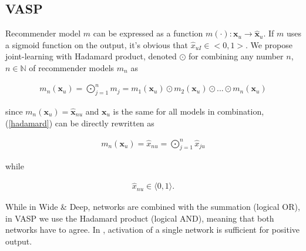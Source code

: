 \documentclass[conference]{IEEEtran}
\begin{document}
    \subsection{VASP}\label{vasp}
    
        
        Recommender model \(m\) can be expressed as a function \(m(\cdot): \mathbf{x}_u \rightarrow \mathbf{\hat{x}}_u\). If \(m\) uses a sigmoid function on the output, it's obvious that \(\hat{x}_{uI} \in <0,1>\). 
        We propose joint-learning with Hadamard product\cite{million2007hadamard}, denoted \(\odot\) for combining any number \(n\), \(n \in \mathbb{N}\) of recommender models \(m_n\) as 
        
            \begin{equation}\label{hadamard}
                \begin{aligned}
                     m_n(\mathbf{x}_{u}) = \bigodot_{j=1}^n{m_j}=m_1(\mathbf{x}_{u}) \odot m_2(\mathbf{x}_{u})\odot...\odot m_n(\mathbf{x}_{u})
                \end{aligned}
            \end{equation}
        
        since \(m_n(\mathbf{x}_{u}) = \mathbf{\hat{x}}_{nu} \) and \(\mathbf{x}_{u}\) is the same for all models in combination, (\ref{hadamard}) can be directly rewritten as
        
            \begin{equation}\label{hadamard2}
                \begin{aligned}
                     m_n(\mathbf{x}_{u}) = \hat{x}_{nu} = \bigodot_{j=1}^n{\hat{x}_{ju}}
                \end{aligned}
            \end{equation}
        
        while
        
            \begin{equation}\label{hadamard_condition}
                \begin{aligned}
                    \hat{x}_{nu} \in \langle0,1\rangle.
                \end{aligned}
            \end{equation}
        
While in Wide \& Deep\cite{Cheng2016}, networks are combined with the summation (logical OR), in VASP we use the Hadamard product (logical AND), meaning that both networks have to agree. In \cite{Cheng2016}, activation of a single network is sufficient for positive output.
        
\end{document}
